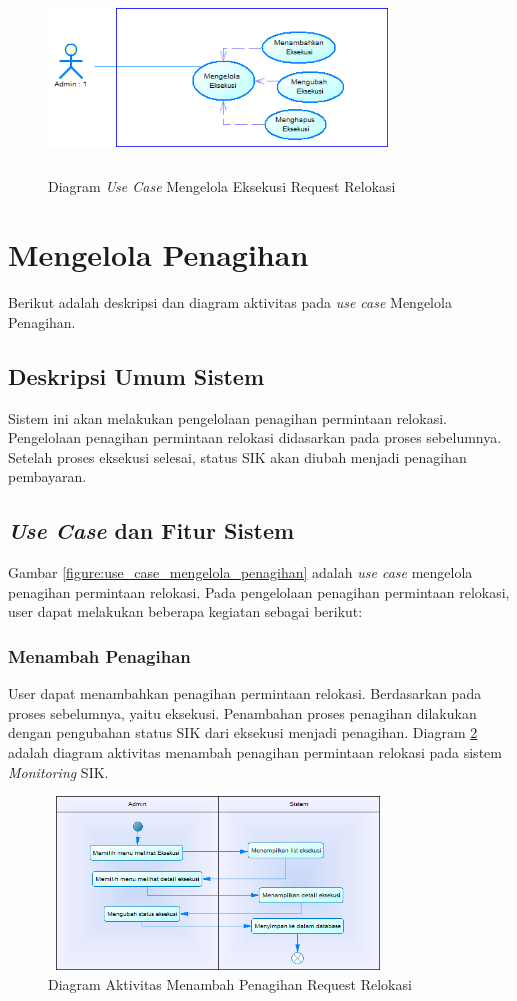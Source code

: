 	\begin{figure}[h]
	\centerline {\includegraphics[width=9cm,height=5cm]{bab4/use-case-mengelola-eksekusi.png}}
	\caption{Diagram \textit{Use Case} Mengelola Eksekusi Request Relokasi}
	\label{figure:use_case_mengelola_eksekusi}
	\end{figure}

\section{Mengelola Penagihan}
Berikut adalah deskripsi dan diagram aktivitas pada \textit{use case} Mengelola Penagihan.
\subsection{Deskripsi Umum Sistem}
\tab Sistem ini akan melakukan pengelolaan penagihan permintaan relokasi. Pengelolaan penagihan permintaan relokasi didasarkan pada proses sebelumnya. Setelah proses eksekusi selesai, status SIK akan diubah menjadi penagihan pembayaran.
\subsection{\textit{Use Case} dan Fitur Sistem}
Gambar \ref{figure:use_case_mengelola_penagihan} adalah \textit{use case} mengelola penagihan permintaan relokasi. Pada pengelolaan penagihan permintaan relokasi, user dapat melakukan beberapa kegiatan sebagai berikut:
	\subsubsection{Menambah Penagihan}
	User dapat menambahkan penagihan permintaan relokasi. Berdasarkan pada proses sebelumnya, yaitu eksekusi. Penambahan proses penagihan dilakukan dengan pengubahan status SIK dari eksekusi menjadi penagihan. Diagram \ref{figure:activity_menambah_penagihan} adalah diagram aktivitas menambah penagihan permintaan relokasi pada sistem \textit{Monitoring} SIK.
	\begin{figure}[h]
	\centerline {\includegraphics[width=9cm,height=4.6cm]{bab4/ActivityDiagram_MenambahkanPenagihan.png}}
	\caption{Diagram Aktivitas Menambah Penagihan Request Relokasi}
	\label{figure:activity_menambah_penagihan}
	\end{figure}
